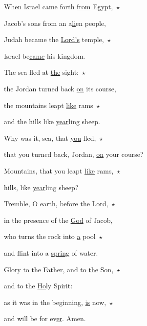 \noindent When Israel came forth \uline{from} Egypt,~$\star$~\nopagebreak

Jacob’s sons from an a\uline{li}en people,

\noindent Judah became the \uline{Lord’s} temple,~$\star$~\nopagebreak

Israel be\uline{came} his kingdom.

\noindent The sea fled at \uline{the} sight:~$\star$~\nopagebreak

the Jordan turned back \uline{on} its course,

\noindent the mountains leapt \uline{like} rams~$\star$~\nopagebreak

and the hills like \uline{year}ling sheep.

\noindent Why was it, sea, that \uline{you} fled,~$\star$~\nopagebreak

that you turned back, Jordan, \uline{on} your course?

\noindent Mountains, that you leapt \uline{like} rams,~$\star$~\nopagebreak

hills, like \uline{year}ling sheep?

\noindent Tremble, O earth, before \uline{the} Lord,~$\star$~\nopagebreak

in the presence of the \uline{God} of Jacob,

\noindent who turns the rock into \uline{a} pool~$\star$~\nopagebreak

and flint into a \uline{spring} of water.

\noindent Glory to the Father, and to \uline{the} Son,~$\star$~\nopagebreak

and to the \uline{Ho}ly Spirit:

\noindent as it was in the beginning, \uline{is} now,~$\star$~\nopagebreak

and will be for ev\uline{er}. Amen.
